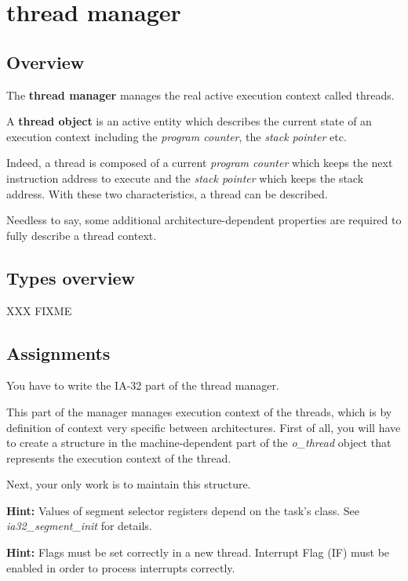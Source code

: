 %
%

\newpage

\section{\textbf{thread} manager}
\subsection*{Overview}

The \textbf{thread manager} manages the real active execution
context called threads.

A \textbf{thread object} is an active entity which describes the
current state of an execution context including the
\textit{program counter}, the \textit{stack pointer} etc.

Indeed, a thread is composed of a current \textit{program counter}
which keeps the next instruction address to execute and the
\textit{stack pointer} which keeps the stack address. With these
two characteristics, a thread can be described.

Needless to say, some additional architecture-dependent properties
are required to fully describe a thread context.

\subsection*{Types overview}
XXX FIXME


\subsection*{Assignments}

You have to write the IA-32 part of the thread manager.

This part of the manager manages execution context of the threads,
which is by definition of context very specific between
architectures. First of all, you will have to create a structure
in the machine-dependent part of the \emph{o\_thread} object that
represents the execution context of the thread.

Next, your only work is to maintain this structure.

\textbf{Hint:} Values of segment selector registers depend on the
task's class. See \emph{ia32\_segment\_init} for details.

\textbf{Hint:} Flags must be set correctly in a new
thread. Interrupt Flag (IF) must be enabled in order to process
interrupts correctly.

